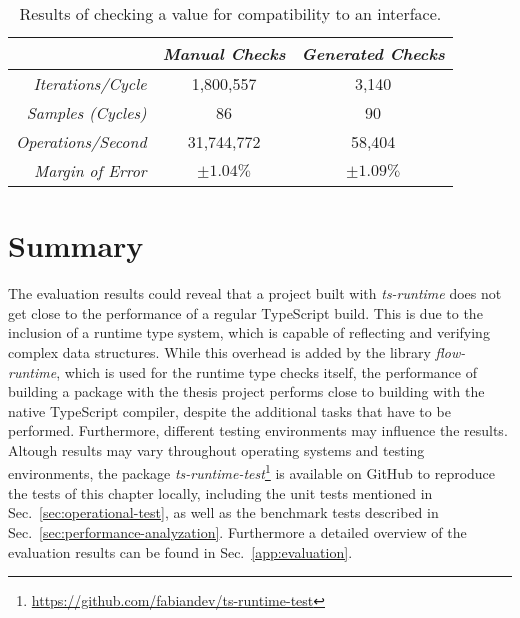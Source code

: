 \begin{table}[ht]
\begin{subtable}[ht]{1.0\textwidth}
  \end{subtable}
  \begin{subtable}[ht]{1.0\textwidth}
    \setlength{\tabcolsep}{5mm}
    \def\arraystretch{1.25}
    \centering
    \caption{Results of checking a value for compatibility to an interface.}
    \begin{tabular}{|r||c|c|}
      \hline
      & \emph{Manual Checks} & \emph{Generated Checks} \\
      \hline
      \hline
      \emph{Iterations/Cycle} & 1,800,557 & 3,140 \\
      \hline
      \emph{Samples (Cycles)} & 86 & 90 \\
      \hline
      \emph{Operations/Second} & 31,744,772 & 58,404 \\
      \hline
      \emph{Margin of Error} & $\pm 1.04\%$ & $\pm 1.09\%$ \\
      \hline
    \end{tabular}
    \label{tab:benchmarks:interface}
  \end{subtable}
\end{table}

\section{Summary}
\label{sec:evaluation-summary}

The evaluation results could reveal that a project built with \emph{ts-runtime} does not get close to the performance of a regular TypeScript build. This is due to the inclusion of a runtime type system, which is capable of reflecting and verifying complex data structures. While this overhead is added by the library \emph{flow-runtime}, which is used for the runtime type checks itself, the performance of building a package with the thesis project performs close to building with the native TypeScript compiler, despite the additional tasks that have to be performed. Furthermore, different testing environments may influence the results. Altough results may vary throughout operating systems and testing environments, the package \emph{ts-runtime-test}\footnote{\url{https://github.com/fabiandev/ts-runtime-test}} is available on GitHub to reproduce the tests of this chapter locally, including the unit tests mentioned in Sec.~\ref{sec:operational-test}, as well as the benchmark tests described in Sec.~\ref{sec:performance-analyzation}. Furthermore a detailed overview of the evaluation results can be found in Sec.~\ref{app:evaluation}.
